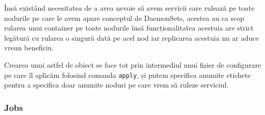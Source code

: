 Însă existând necesitatea de a avea nevoie să avem servicii care rulează pe toate
nodurile pe care le avem apare conceptul de DaemonSets, acestea au ca scop rularea unui container
pe toate nodurile însă funcționalitatea acestuia are strict legătură cu rularea o singură dată pe acel nod
iar replicarea acestuia nu ar aduce vreun beneficiu.

Crearea unui astfel de obiect se face tot prin intermediul unui fișier de configurare 
pe care îl aplicăm folosind comanda \verb|apply|, și putem specifica anumite etichete 
pentru a specifica doar anumite noduri pe care vrem să ruleze serviciul.

\subsubsection{Jobs}
